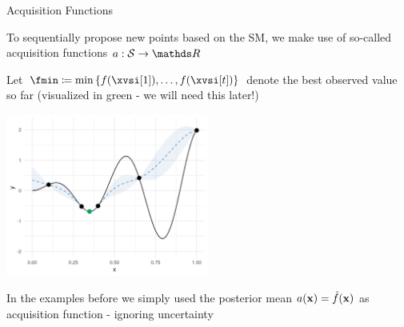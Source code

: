 \documentclass[11pt,compress,t,notes=noshow, xcolor=table]{beamer}
\begin{document}
\begin{vbframe}{Acquisition Functions}

To sequentially propose new points based on the SM, we make use of so-called acquisition functions $a: \mathcal{S} \to \R$\\

\vspace{1em}

Let $\fmin \coloneqq \min \left\{f(\xvsi[1]), \ldots, f(\xvsi[t])\right\}$ denote the best observed value so far (visualized in green - we will need this later!)
\vspace*{-0.2cm}

\begin{center}
  \includegraphics[width = 0.5\textwidth]{figure_man/bayesian_loop_sm_fmin.png}
\end{center}

\vspace*{-0.3cm}

In the examples before we simply used the posterior mean $a(\mathbf{x}) = \hat{f}(\mathbf{x})$ as acquisition function - ignoring uncertainty

\end{vbframe}
\end{document}
